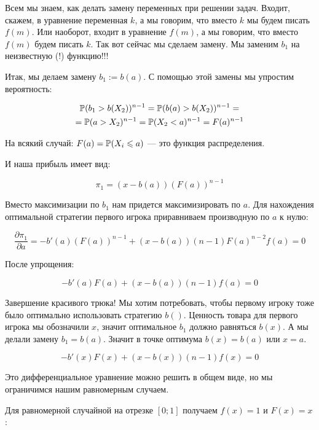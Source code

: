 \begin{enumerate}
Всем мы знаем, как делать замену переменных при решении задач. Входит, скажем, в уравнение переменная $ k $, а мы говорим, что вместо $ k $ мы будем писать $ f(m) $. Или наоборот, входит в уравнение $ f(m) $, а мы говорим, что вместо $ f(m) $ будем писать $ k $. Так вот сейчас мы сделаем замену. Мы заменим $ b_{1} $ на неизвестную (!) функцию!!!

Итак, мы делаем замену $ b_{1}:=b(a) $. С помощью этой замены мы упростим вероятность:

\begin{multline}
\P(b_{1}>b(X_{2}))^{n-1}=\P(b(a)>b(X_{2}))^{n-1}=\\
=\P(a>X_{2})^{n-1}=\P(X_{2}<a)^{n-1}=F(a)^{n-1}
\end{multline}

На всякий случай: $ F(a)=\P(X_{i}\leq a) $ — это функция распределения.

И наша прибыль имеет вид:

\begin{equation}
\pi_{1}=(x-b(a))(F(a))^{n-1}
\end{equation}


Вместо максимизации по $ b_{1} $ нам придется максимизировать по $ a $. Для нахождения оптимальной стратегии первого игрока приравниваем производную по $ a $ к нулю:

\begin{equation}
\frac{\partial \pi_{1}}{\partial a}=-b'(a)(F(a))^{n-1}+(x-b(a))(n-1)F(a)^{n-2}f(a)=0
\end{equation}


После упрощения:

\begin{equation}
-b'(a)F(a)+(x-b(a))(n-1)f(a)=0
\end{equation}


Завершение красивого трюка! Мы хотим потребовать, чтобы первому игроку тоже было оптимально использовать стратегию $ b() $. Ценность товара для первого игрока мы обозначили $ x $, значит оптимальное $ b_{1} $ должно равняться $ b(x) $. А мы делали замену $ b_{1}=b(a) $. Значит в точке оптимума $ b(x)=b(a) $ или $ x=a $.

\begin{equation}
\label{first_price_final_diffeq}
-b'(x)F(x)+(x-b(x))(n-1)f(x)=0
\end{equation}


Это дифференциальное уравнение можно решить в общем виде, но мы ограничимся нашим равномерным случаем.

Для равномерной случайной на отрезке $ [0;1] $ получаем $ f(x)=1 $ и $ F(x)=x $:


\end{enumerate}
